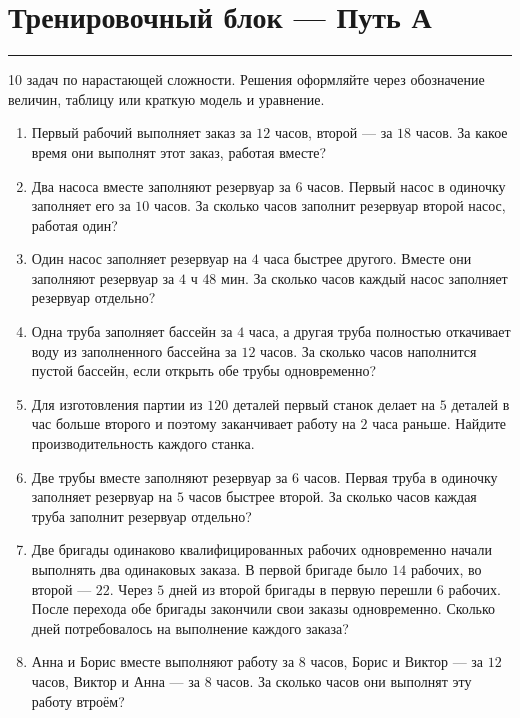\documentclass[a4paper,12pt]{article}
\newcommand{\sectionrule}{\par\vspace{-0.25em}\noindent\textcolor{accent}{\rule{\linewidth}{0.6pt}}\par\vspace{0.25em}}
\begin{document}
\section*{Тренировочный блок --- Путь А}
\sectionrule
{\color{softgray}10 задач по нарастающей сложности. Решения оформляйте через обозначение величин, таблицу или краткую модель и уравнение.}

\begin{enumerate}[leftmargin=1.8em,label=\textbf{\arabic*.},itemsep=0.75em]
\item Первый рабочий выполняет заказ за $12$ часов, второй --- за $18$ часов. За какое время они выполнят этот заказ, работая вместе?

\item Два насоса вместе заполняют резервуар за $6$ часов. Первый насос в одиночку заполняет его за $10$ часов. За сколько часов заполнит резервуар второй насос, работая один?

\item Один насос заполняет резервуар на $4$ часа быстрее другого. Вместе они заполняют резервуар за $4$ ч $48$ мин. За сколько часов каждый насос заполняет резервуар отдельно?

\item Одна труба заполняет бассейн за $4$ часа, а другая труба полностью откачивает воду из заполненного бассейна за $12$ часов. За сколько часов наполнится пустой бассейн, если открыть обе трубы одновременно?

\item Для изготовления партии из $120$ деталей первый станок делает на $5$ деталей в час больше второго и поэтому заканчивает работу на $2$ часа раньше. Найдите производительность каждого станка.

\item Две трубы вместе заполняют резервуар за $6$ часов. Первая труба в одиночку заполняет резервуар на $5$ часов быстрее второй. За сколько часов каждая труба заполнит резервуар отдельно?

\item Две бригады одинаково квалифицированных рабочих одновременно начали выполнять два одинаковых заказа. В первой бригаде было $14$ рабочих, во второй --- $22$. Через $5$ дней из второй бригады в первую перешли $6$ рабочих. После перехода обе бригады закончили свои заказы одновременно. Сколько дней потребовалось на выполнение каждого заказа?

\item Анна и Борис вместе выполняют работу за $8$ часов, Борис и Виктор --- за $12$ часов, Виктор и Анна --- за $8$ часов. За сколько часов они выполнят эту работу втроём?


\end{enumerate}
\end{document}
